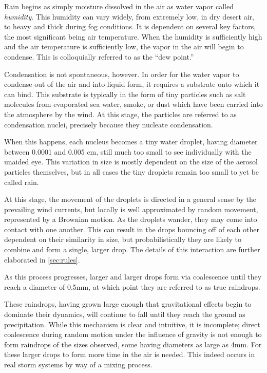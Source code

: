 \documentclass[twocolumn,a4paper,10pt]{article}
\begin{document}
Rain begins as simply moisture dissolved in the air as water vapor called
\emph{humidity}.  This humidity can vary widely, from extremely low, in dry
desert air, to heavy and thick during fog conditions. It is dependent on several
key factors, the most significant being air temperature\citet{hu1998}. When the
humidity is sufficiently high and the air temperature is sufficiently low, the
vapor in the air will begin to condense. This is colloquially referred to as the
``dew point.''

Condensation is not spontaneous, however. In order for the water vapor to
condense out of the air and into liquid form, it requires a substrate onto which
it can bind.  This substrate is typically in the form of tiny particles such as
salt molecules from evaporated sea water, smoke, or dust which have been carried
into the atmosphere by the wind. At this stage, the particles are referred to as
condensation nuclei, precisely because they nucleate condensation.

When this happens, each nucleus becomes a tiny water droplet, having diameter
between 0.0001 and 0.005 cm, still much too small to see individually with the
unaided eye. This variation in size is mostly dependent on the size of the
aerosol particles themselves, but in all cases the tiny droplets remain too
small to yet be called rain.

At this stage, the movement of the droplets is directed in a general sense by
the prevailing wind currents, but locally is well approximated by random
movement, represented by a Brownian motion. As the droplets wander, they may
come into contact with one another. This can result in the drops bouncing off of
each other dependent on their similarity in size, but probabilistically they
are likely to combine and form a single, larger drop. The details of this
interaction are further elaborated in \autoref{sec:rules}.

As this process progresses, larger and larger drops form via coalescence until
they reach a diameter of 0.5mm, at which point they are referred to as true
raindrops.

These raindrops, having grown large enough that gravitational effects begin to
dominate their dynamics, will continue to fall until they reach the ground as
precipitation. While this mechanism is clear and intuitive, it is incomplete;
direct coalescence during random motion under the influence of gravity is not
enough to form raindrops of the sizes observed, some having diameters as large
as 4mm. For these larger drops to form more time in the air is needed. This
indeed occurs in real storm systems by way of a mixing process.
\end{document}
